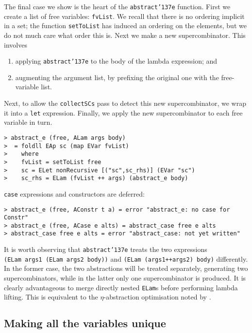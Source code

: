The final case we show is the heart of the \mbox{\tt abstract{\char'137}e} function.
First we create a list of free variables: \mbox{\tt fvList}. We recall that
there is no ordering implicit in a set; the function \mbox{\tt setToList} has
induced an ordering on the elements, but we do not much care what order
this is. Next we make a new supercombinator. This involves
\begin{enumerate}
\item applying \mbox{\tt abstract{\char'137}e} to the body of the lambda expression; and

\item augmenting the argument list, by prefixing the original one with
the free-variable list.
\end{enumerate}
Next, to allow the \mbox{\tt collectSCs} pass to detect this new
supercombinator, we wrap it into a \mbox{\tt let} expression.  Finally, we apply
the new supercombinator to each free variable in turn.
\begin{verbatim}
> abstract_e (free, ALam args body)
>  = foldll EAp sc (map EVar fvList)
>    where
>    fvList = setToList free
>    sc = ELet nonRecursive [("sc",sc_rhs)] (EVar "sc")
>    sc_rhs = ELam (fvList ++ args) (abstract_e body)
\end{verbatim}
\mbox{\tt case} expressions and constructors are deferred:
\begin{verbatim}
> abstract_e (free, AConstr t a) = error "abstract_e: no case for Constr"
> abstract_e (free, ACase e alts) = abstract_case free e alts
> abstract_case free e alts = error "abstract_case: not yet written"
\end{verbatim}
It is worth observing that \mbox{\tt abstract{\char'137}e} treats the two expressions
\linebreak[3]
\mbox{\tt (ELam\ args1\ (ELam\ args2\ body))} and \mbox{\tt (ELam\ (args1++args2)\ body)}
\linebreak[3]
differently.  In the former case, the two abstractions will be treated
separately, generating two supercombinators, while in the latter only
one supercombinator is produced.  It is clearly advantageous to merge
directly nested \mbox{\tt ELam}s before performing lambda lifting.  This is
equivalent to the $\eta$-abstraction optimisation noted by
\cite{HughesThesis}.

\subsection{Making all the variables unique}

